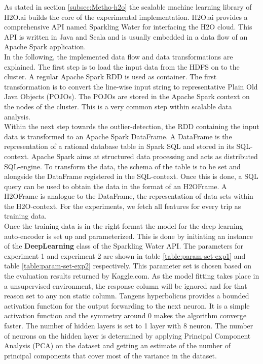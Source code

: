 \documentclass{vldb}
\begin{document}
As stated in section \ref{subsec:Metho-h2o} the scalable machine learning library of H2O.ai builds the core of the experimental implementation. H2O.ai provides a comprehensive API named Sparkling Water for interfacing the H2O cloud. This API is written in Java and Scala and is usually embedded in a data flow of an Apache Spark application. \\
In the following, the implemented data flow and data transformations are explained. The first step is to load the input data from the HDFS on to the cluster. A regular Apache Spark RDD is used as container. The first transformation is to convert the line-wise input string to representative Plain Old Java Objects (POJOs). The POJOs are stored in the Apache Spark context on the nodes of the cluster. This is a very common step within scalable data analysis.\\
Within the next step towards the outlier-detection, the RDD containing the input data is transformed to an Apache Spark DataFrame. A DataFrame is the representation of a rational database table in Spark SQL and stored in its SQL-context. Apache Spark aims at structured data processing and acts as distributed SQL-engine. To transform the data, the schema of the table is to be set and alongside the DataFrame registered in the SQL-context. Once this is done, a SQL query can be used to obtain the data in the format of an H2OFrame. A H2OFrame is analogue to the DataFrame, the representation of data sets within the H2O-context. For the experiments, we fetch all features for every trip as training data.\\
Once the training data is in the right format the model for the deep learning auto-encoder is set up and parameterized. This is done by initiating an instance of the \textbf{DeepLearning} class of the Sparkling Water API. The parameters for experiment 1 and experiment 2 are shown in table \ref{table:param-set-exp1} and table \ref{table:param-set-exp2} respectively. This parameter set is chosen based on the evaluation results returned by Kaggle.com. As the model fitting takes place in a unsupervised environment, the response column will be ignored and for that reason set to any non static column. Tangens hyperbolicus provides a bounded activation function for the output forwarding to the next neuron. It is a simple activation function and the symmetry around 0 makes the algorithm converge faster. The number of hidden layers is set to 1 layer with 8 neuron. The number of neurons on the hidden layer is determined by applying Principal Component Analysis (PCA) on the dataset and getting an estimate of the number of principal components that cover most of the variance in the dataset.
\end{document}
